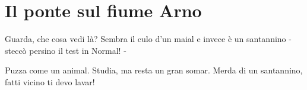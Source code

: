 \section{Il ponte sul fiume Arno}
\begin{canzone}
Guarda, che cosa vedi là?
Sembra il culo d’un maial
e invece è un santannino
- steccò persino il test in Normal! -

Puzza come un animal.
Studia, ma resta un gran somar.
Merda di un santannino,
fatti vicino ti devo lavar!
\end{canzone}
